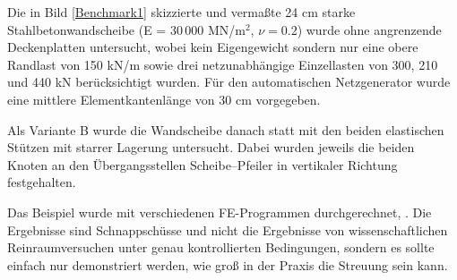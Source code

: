 {Die in Bild \ref{Benchmark1} skizzierte und verma{\ss}te 24 cm starke Stahlbetonwandscheibe
(E = 30\,000 MN/m$^2$, $\nu = 0.2$) wurde ohne angrenzende Deckenplatten untersucht,
wobei kein Eigengewicht sondern nur eine obere Randlast von 150 kN/m sowie drei
netzunabh\"{a}ngige Einzellasten von 300, 210 und 440 kN ber\"{u}cksichtigt wurden. F\"{u}r den
automatischen Netzgenerator wurde eine mittlere Elementkantenl\"{a}nge von 30 cm vorgegeben.

Als Variante B wurde die Wandscheibe danach statt mit den beiden elastischen St\"{u}tzen mit
starrer Lagerung untersucht. Dabei wurden jeweils die beiden Knoten an den
\"{U}bergangsstellen Scheibe--Pfeiler in vertikaler Richtung festgehalten.

Das Beispiel wurde mit verschiedenen FE-Programmen durchgerechnet, \cite{Schaper}. Die
Ergebnisse sind Schnappsch\"{u}sse und nicht die Ergebnisse von wissenschaftlichen
Reinraumversuchen unter genau kontrollierten Bedingungen, sondern es sollte einfach nur
demonstriert werden, wie gro{\ss} in der Praxis die Streuung sein kann.

}
